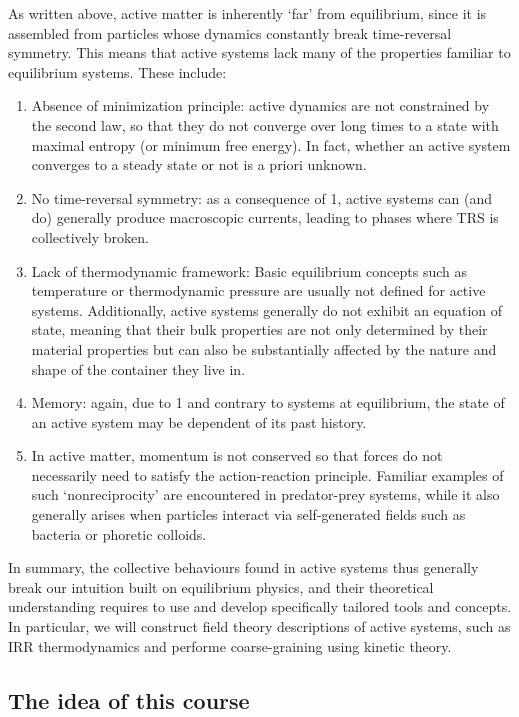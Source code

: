 As written above, active matter is inherently `far' from equilibrium, since it is assembled from particles whose dynamics constantly break time-reversal symmetry. This means that active systems lack many of the properties familiar to equilibrium systems. These include:
%
\begin{enumerate}
    \item Absence of minimization principle: active dynamics are not constrained by the second law, so that they do not converge over long times to a state with maximal entropy (or minimum free energy). In fact, whether an active system converges to a steady state or not is a priori unknown.
    \item No time-reversal symmetry: as a consequence of 1, active systems can (and do) generally produce macroscopic currents, leading to phases where TRS is collectively broken.
    \item Lack of thermodynamic framework: Basic equilibrium concepts such as temperature or thermodynamic pressure are usually not defined for active systems. Additionally, active systems generally do not exhibit an equation of state, meaning that their bulk properties are not only determined by their material properties but can also be substantially affected by the nature and shape of the container they live in.
    \item Memory: again, due to 1 and contrary to systems at equilibrium, the state of an active system may be dependent of its past history.
    \item In active matter, momentum is not conserved so that forces do not necessarily need to satisfy the action-reaction principle. Familiar examples of such `nonreciprocity' are encountered in predator-prey systems, while it also generally arises when particles interact via self-generated fields such as bacteria or phoretic colloids.
\end{enumerate}
%
In summary, the collective behaviours found in active systems thus generally break our intuition built on equilibrium physics, and their theoretical understanding requires to use and develop specifically tailored tools and concepts.
In particular, we will construct field theory descriptions of active systems, such as IRR thermodynamics and performe coarse-graining using kinetic theory.



\subsection{The idea of this course}


